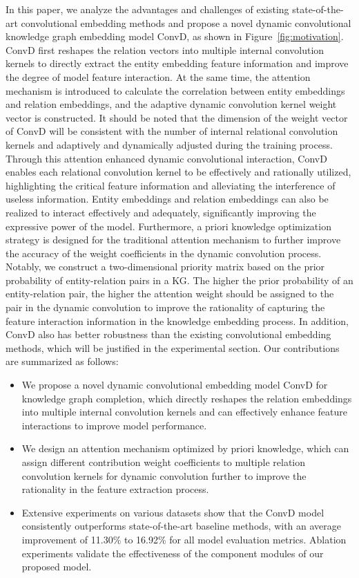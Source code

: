 \documentclass[letterpaper]{article} %
\begin{document}
In this paper, we analyze the advantages and challenges of existing state-of-the-art convolutional embedding methods and propose a novel dynamic convolutional knowledge graph embedding model ConvD, as shown in Figure~\ref{fig:motivation}. ConvD first reshapes the relation vectors into multiple internal convolution kernels to directly extract the entity embedding feature information and improve the degree of model feature interaction. At the same time, the attention mechanism is introduced to calculate the correlation between entity embeddings and relation embeddings, and the adaptive dynamic convolution kernel weight vector is constructed. It should be noted that the dimension of the weight vector of ConvD will be consistent with the number of internal relational convolution kernels and adaptively and dynamically adjusted during the training process. Through this attention enhanced dynamic convolutional interaction, ConvD enables each relational convolution kernel to be effectively and rationally utilized, highlighting the critical feature information and alleviating the interference of useless information. Entity embeddings and relation embeddings can also be realized to interact effectively and adequately, significantly improving the expressive power of the model. Furthermore, a priori knowledge optimization strategy is designed for the traditional attention mechanism to further improve the accuracy of the weight coefficients in the dynamic convolution process. Notably, we construct a two-dimensional priority matrix based on the prior probability of entity-relation pairs in a KG. The higher the prior probability of an entity-relation pair, the higher the attention weight should be assigned to the pair in the dynamic convolution to improve the rationality of capturing the feature interaction information in the knowledge embedding process. In addition, ConvD also has better robustness than the existing convolutional embedding methods, which will be justified in the experimental section. Our contributions are summarized as follows:
\begin{itemize}
    \item We propose a novel dynamic convolutional embedding model ConvD for knowledge graph completion, which directly reshapes the relation embeddings into multiple internal convolution kernels and can effectively enhance feature interactions to improve model performance.
    \item We design an attention mechanism optimized by priori knowledge, which can assign different contribution weight coefficients to multiple relation convolution kernels for dynamic convolution further to improve the rationality in the feature extraction process.
    \item Extensive experiments on various datasets show that the ConvD model consistently outperforms state-of-the-art baseline methods, with an average improvement of 11.30\% to 16.92\% for all model evaluation metrics. Ablation experiments validate the effectiveness of the component modules of our proposed model.
\end{itemize}
\end{document}
